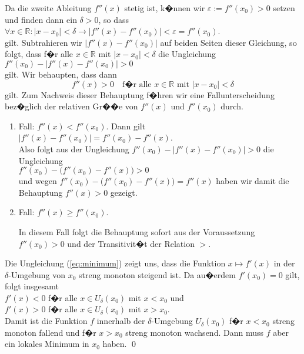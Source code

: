 \proof Da die zweite Ableitung $f''(x)$ stetig ist, k�nnen wir $\varepsilon := f''(x_0) > 0$
setzen und finden dann ein $\delta > 0$, so dass
\\[0.2cm]
\hspace*{1.3cm} $\forall x \in \mathbb{R}: |x - x_0| < \delta \rightarrow |f''(x) - f''(x_0)|
< \varepsilon = f''(x_0)$.
\\[0.2cm]
gilt.  Subtrahieren wir $|f''(x) - f''(x_0)|$ auf beiden Seiten dieser Gleichung, so folgt, dass f�r
alle $x \in \mathbb{R}$ mit $|x - x_0| < \delta$ die Ungleichung
\\[0.2cm]
\hspace*{1.3cm} $f''(x_0) - |f''(x) - f''(x_0)| > 0$
\\[0.2cm]
gilt.  Wir behaupten, dass dann
\begin{equation}
  \label{eq:minimum}
 f''(x) > 0 \quad \mbox{f�r alle $x \in \mathbb{R}$ mit $|x - x_0| < \delta$} 
\end{equation}
gilt.
Zum Nachweis dieser Behauptung f�hren wir eine Fallunterscheidung bez�glich der relativen
Gr��e von $f''(x)$ und $f''(x_0)$ durch.
\begin{enumerate}
\item Fall: $f''(x) < f''(x_0)$.  Dann gilt 
      \\[0.2cm]
      \hspace*{1.3cm}
      $|f''(x) - f''(x_0)| = f''(x_0) - f''(x)$.
      \\[0.2cm]
      Also folgt aus der Ungleichung $f''(x_0) - |f''(x) - f''(x_0)| > 0$ die Ungleichung
      \\[0.2cm]
      \hspace*{1.3cm}
      $f''(x_0) - \bigl(f''(x_0) - f''(x)\bigr) > 0$
      \\[0.2cm]
      und wegen $f''(x_0) - \bigl(f''(x_0) - f''(x)\bigr) = f''(x)$ haben wir damit die Behauptung
      $f''(x) > 0$ gezeigt.
\item Fall: $f''(x) \geq f''(x_0)$.  

      In diesem Fall folgt die Behauptung sofort aus der Voraussetzung
      $f''(x_0) > 0$ und der Transitivit�t der Relation $>$.
\end{enumerate}
Die Ungleichung (\ref{eq:minimum}) zeigt uns, dass die Funktion $x \mapsto f'(x)$ in der $\delta$-Umgebung
von $x_0$ streng monoton steigend ist.  Da au�erdem $f'(x_0) = 0$ gilt, folgt insgesamt
\\[0.2cm]
\hspace*{1.3cm}
$f'(x) < 0$ \quad f�r alle $x\in U_\delta(x_0)$ mit $x < x_0$ \quad und \quad \\[0.2cm]
\hspace*{1.3cm}
$f'(x) > 0$ \quad f�r alle $x\in U_\delta(x_0)$ mit $x > x_0$.
\\[0.2cm]
Damit ist die Funktion $f$ innerhalb der $\delta$-Umgebung $U_\delta(x_0)$ f�r $x < x_0$
streng monoton fallend und f�r $x > x_0$ streng monoton wachsend.  Dann muss $f$ aber ein lokales Minimum in
$x_0$ haben. \qed


